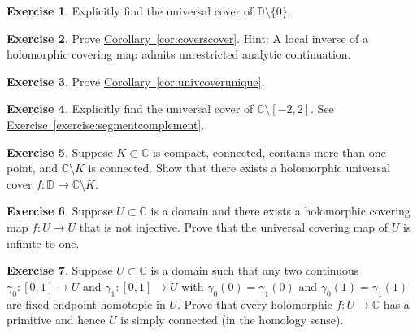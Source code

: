 \documentclass[12pt,openany]{book}
\newcommand{\C}{{\mathbb{C}}}
\newcommand{\D}{{\mathbb{D}}}
\theoremstyle{plain}
\theoremstyle{remark}
\theoremstyle{definition}
\newenvironment{exbox}{%
    \def\FrameCommand{\vrule width 1pt \relax\hspace{10pt}}%
    \MakeFramed{\advance\hsize-\width\FrameRestore}%
}{%
    \endMakeFramed
}
\theoremstyle{exercise}
\newtheorem{exercise}{Exercise}[section]
\theoremstyle{example}
\newcommand{\exerciseref}[1]{\hyperref[#1]{Exercise~\ref*{#1}}}
\newcommand{\corref}[1]{\hyperref[#1]{Corollary~\ref*{#1}}}
\begin{document}
\begin{exbox}
\begin{exercise}
Explicitly find the universal cover of $\D \setminus \{ 0 \}$.
\end{exercise}

\begin{exercise}
Prove \corref{cor:coverscover}.  Hint: A local inverse of a holomorphic covering map
admits unrestricted analytic continuation.
\end{exercise}

\begin{exercise}
Prove \corref{cor:univcoverunique}.
\end{exercise}

\begin{exercise}
Explicitly find the universal cover of $\C \setminus [-2,2]$.
See \exerciseref{exercise:segmentcomplement}.
\end{exercise}

\begin{exercise}
Suppose $K \subset \C$ is compact, connected, contains more than one
point, and $\C \setminus K$ is connected.  Show that there
exists a holomorphic universal cover $f \colon \D \to \C \setminus K$.
\end{exercise}

\begin{exercise}
Suppose $U \subset \C$ is a domain and there exists a
holomorphic covering map
$f \colon U \to U$ that is not injective.
Prove that the universal covering map of $U$ is infinite-to-one.
\end{exercise}

\begin{exercise} \label{exercise:EPHimpliesSC}
Suppose $U \subset \C$ is a domain such that 
any two continuous 
$\gamma_0 \colon [0,1] \to U$ and
$\gamma_1 \colon [0,1] \to U$
with
$\gamma_0(0)=\gamma_1(0)$ and
$\gamma_0(1)=\gamma_1(1)$ are fixed-endpoint homotopic in $U$.
Prove that every holomorphic $f \colon U \to \C$ has a primitive
and hence $U$ is simply connected (in the homology sense).
\end{exercise}
\end{exbox}


\appendix
\end{document}
